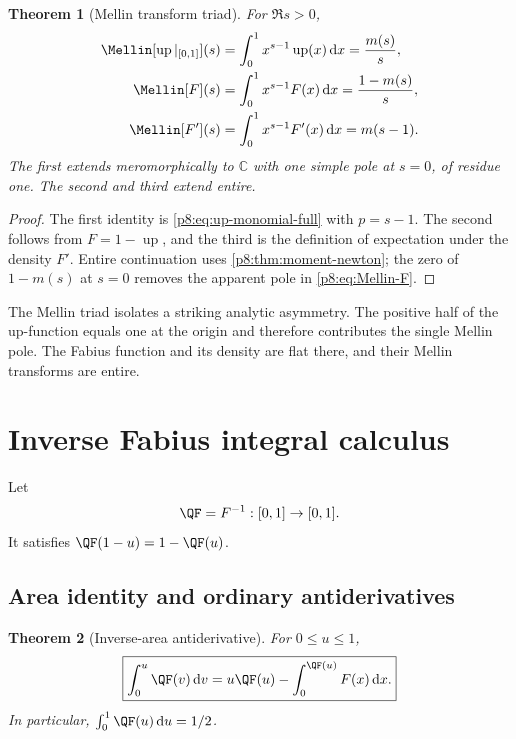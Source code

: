 \documentclass[11pt,oneside]{article}
\newtheorem{theorem}{Theorem}[section]
\theoremstyle{definition}
\theoremstyle{remark}
\newcommand{\Up}{\operatorname{up}}
\newcommand{\C}{\mathbb C}
\newcommand{\dd}{\,\mathrm d}
\newcommand{\1}{\mathbf 1}
\begin{document}
\begin{theorem}[Mellin transform triad]
\label{p8:thm:mellin-triad}
For \(\Re s>0\),
\begin{align}
 \Mellin[\Up|_{[0,1]}](s)
 &=\int_0^1x^{s-1}\Up(x)\dd x
 =\frac{m(s)}s,
 \label{p8:eq:Mellin-up}\\
 \Mellin[F](s)
 &=\int_0^1x^{s-1}F(x)\dd x
 =\frac{1-m(s)}s,
 \label{p8:eq:Mellin-F}\\
 \Mellin[F'](s)
 &=\int_0^1x^{s-1}F'(x)\dd x
 =m(s-1).
 \label{p8:eq:Mellin-density}
\end{align}
The first extends meromorphically to \(\C\) with one simple pole at \(s=0\),
of residue one.  The second and third extend entire.  \statusprovedPartll
\end{theorem}

\begin{proof}
The first identity is \eqref{p8:eq:up-monomial-full} with \(p=s-1\).  The second
follows from \(F=1-\Up\), and the third is the definition of expectation under
the density \(F'\).  Entire continuation uses \cref{p8:thm:moment-newton}; the zero
of \(1-m(s)\) at \(s=0\) removes the apparent pole in \eqref{p8:eq:Mellin-F}.
\end{proof}

The Mellin triad isolates a striking analytic asymmetry.  The positive half of
the up-function equals one at the origin and therefore contributes the single
Mellin pole.  The Fabius function and its density are flat there, and their
Mellin transforms are entire.

\section{Inverse Fabius integral calculus}
\label{p8:sec:inverse}

Let
\begin{equation}
 \QF=F^{-1}:[0,1]\to[0,1].
 \label{p8:eq:Qdef}
\end{equation}
It satisfies \(\QF(1-u)=1-\QF(u)\).

\subsection{Area identity and ordinary antiderivatives}

\begin{theorem}[Inverse-area antiderivative]
\label{p8:thm:inverse-area}
For \(0\le u\le1\),
\begin{equation}
 \boxed{\int_0^u\QF(v)\dd v
 =u\QF(u)-\int_0^{\QF(u)}F(x)\dd x.}
 \label{p8:eq:inverse-area}
\end{equation}
In particular, \(\int_0^1\QF(u)\dd u=1/2\).  \statusprovedPartll
\end{theorem}
\end{document}
